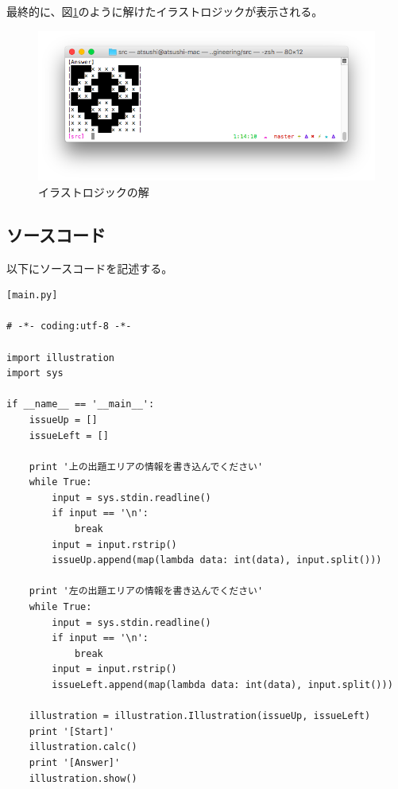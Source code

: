 \documentclass[a4j]{jarticle}
\begin{document}
最終的に、図\ref{fig:answer}のように解けたイラストロジックが表示される。

\begin{figure}[hp]
\centering
\includegraphics[width=15cm]{./image/answer.png}
\caption{イラストロジックの解}
\label{fig:answer}
\end{figure}

\clearpage
\subsection{ソースコード}
以下にソースコードを記述する。

\begin{lstlisting}[basicstyle=\ttfamily\footnotesize, frame=single]
[main.py]

# -*- coding:utf-8 -*-

import illustration
import sys

if __name__ == '__main__':
    issueUp = []
    issueLeft = []

    print '上の出題エリアの情報を書き込んでください'
    while True:
        input = sys.stdin.readline()
        if input == '\n':
            break
        input = input.rstrip()
        issueUp.append(map(lambda data: int(data), input.split()))

    print '左の出題エリアの情報を書き込んでください'
    while True:
        input = sys.stdin.readline()
        if input == '\n':
            break
        input = input.rstrip()
        issueLeft.append(map(lambda data: int(data), input.split()))

    illustration = illustration.Illustration(issueUp, issueLeft)
    print '[Start]'
    illustration.calc()
    print '[Answer]'
    illustration.show()

\end{lstlisting}
\end{document}
